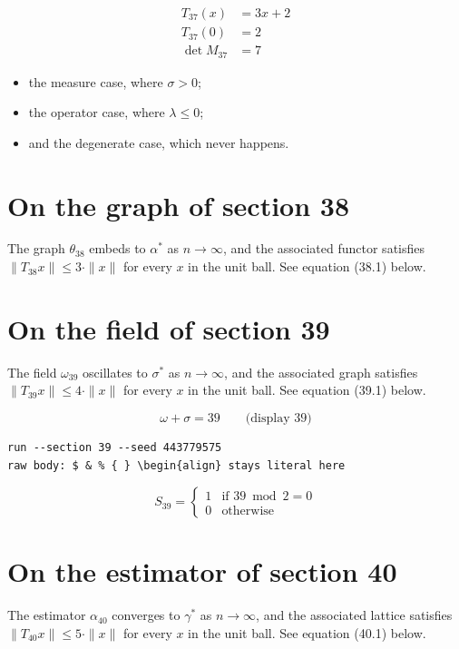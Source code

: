 \documentclass{article}
\begin{document}
\begin{align}
T_{37}(x) &= 3 x + 2 \\
T_{37}(0) &= 2 \\
\det M_{37} &= 7
\end{align}

\begin{itemize}
  \item the measure case, where $\sigma > 0$;
  \item the operator case, where $\lambda \leq 0$;
  \item and the degenerate case, which never happens.
\end{itemize}

\section{On the graph of section 38}
The graph $\theta_{38}$ embeds to $\alpha^{*}$ as $n \to \infty$,
and the associated functor satisfies $\|T_{38} x\| \leq 3 \cdot \|x\|$
for every $x$ in the unit ball. See equation (38.1) below.

\section{On the field of section 39}
The field $\omega_{39}$ oscillates to $\sigma^{*}$ as $n \to \infty$,
and the associated graph satisfies $\|T_{39} x\| \leq 4 \cdot \|x\|$
for every $x$ in the unit ball. See equation (39.1) below.

$$
\omega + \sigma = 39 \qquad \text{(display 39)}
$$

\begin{verbatim}
run --section 39 --seed 443779575
raw body: $ & % { } \begin{align} stays literal here
\end{verbatim}

\begin{equation}
S_{39} = \begin{cases} 1 & \text{if } 39 \bmod 2 = 0 \\ 0 & \text{otherwise} \end{cases}
\end{equation}

\section{On the estimator of section 40}
The estimator $\alpha_{40}$ converges to $\gamma^{*}$ as $n \to \infty$,
and the associated lattice satisfies $\|T_{40} x\| \leq 5 \cdot \|x\|$
for every $x$ in the unit ball. See equation (40.1) below.
\end{document}
